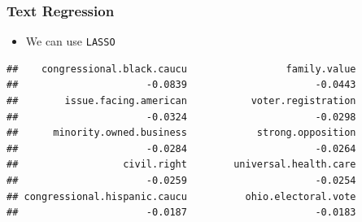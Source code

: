 \documentclass[
  shownotes,
  xcolor={svgnames},
  hyperref={colorlinks,citecolor=DarkBlue,linkcolor=DarkRed,urlcolor=DarkBlue}
  , aspectratio=169]{beamer}
\newenvironment{Shaded}{\begin{snugshade}}{\end{snugshade}}
\newcommand{\CommentTok}[1]{\textcolor[rgb]{0.56,0.35,0.01}{\textit{#1}}}
\newcommand{\DecValTok}[1]{\textcolor[rgb]{0.00,0.00,0.81}{#1}}
\newcommand{\KeywordTok}[1]{\textcolor[rgb]{0.13,0.29,0.53}{\textbf{#1}}}
\newcommand{\NormalTok}[1]{#1}
\newcommand{\OperatorTok}[1]{\textcolor[rgb]{0.81,0.36,0.00}{\textbf{#1}}}
\newcommand{\StringTok}[1]{\textcolor[rgb]{0.31,0.60,0.02}{#1}}
\begin{document}
\begin{frame}[fragile]
\frametitle{Text Regression}

\begin{itemize}
  \item We can use {\tt LASSO}
\end{itemize}
\begin{scriptsize}

\begin{Shaded}
\end{Shaded}

\end{scriptsize}
\begin{tiny}


\begin{verbatim}
##    congressional.black.caucu                 family.value 
##                      -0.0839                      -0.0443 
##        issue.facing.american           voter.registration 
##                      -0.0324                      -0.0298 
##      minority.owned.business            strong.opposition 
##                      -0.0284                      -0.0264 
##                  civil.right        universal.health.care 
##                      -0.0259                      -0.0254 
## congressional.hispanic.caucu          ohio.electoral.vote 
##                      -0.0187                      -0.0183
\end{verbatim}
\end{tiny}

\end{frame}
\end{document}
